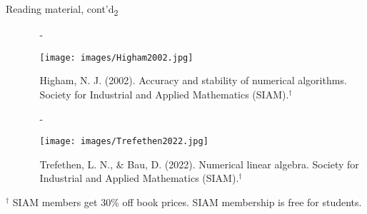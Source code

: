 \documentclass[t,usepdftitle=false]{beamer}
\begin{document}
\begin{frame}{Reading material, cont'd\textsubscript{2}}
\begin{itemize}
\item[]
\begin{itemize}
\item[-]\begin{minipage}{0.2\textwidth}\vspace{.3cm}
\texttt{[image: images/Higham2002.jpg]}
\end{minipage}
\hspace{-.8cm}
\begin{minipage}{0.75\textwidth}
Higham, N. J. (2002). Accuracy and stability of numerical algorithms. 
Society for Industrial and Applied Mathematics (SIAM).${}^\dagger$
\end{minipage}\vspace{.3cm}
\item[-]\begin{minipage}{0.2\textwidth}\vspace{.3cm}
\texttt{[image: images/Trefethen2022.jpg]}
\end{minipage}
\hspace{-.8cm}
\begin{minipage}{0.75\textwidth}
Trefethen, L. N., \& Bau, D. (2022). Numerical linear algebra. 
Society for Industrial and Applied Mathematics (SIAM).${}^\dagger$
\end{minipage}
\end{itemize}
\end{itemize}
\vspace{3.3cm}
\tiny{${}^\dagger$ SIAM members get 30\% off book prices. SIAM membership is free for students.}
\end{frame}
\end{document}
